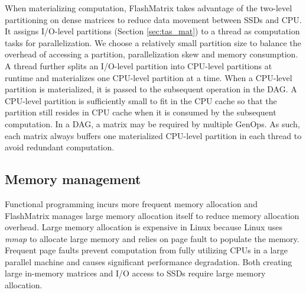 When materializing computation, FlashMatrix takes advantage of the two-level
partitioning on dense matrices to reduce data movement between SSDs and CPU.
It assigns I/O-level partitions (Section \ref{sec:tas_mat}) to a thread as
computation tasks for parallelization. We choose a relatively small partition
size to balance the overhead of accessing a partition, parallelization skew
and memory consumption. A thread further splits an I/O-level partition into
CPU-level partitions at runtime and materializes one CPU-level partition at
a time. When a CPU-level partition is materialized, it is passed to the
subsequent operation in the DAG. A CPU-level partition is sufficiently small
to fit in the CPU cache so that the partition still resides in CPU cache when
it is consumed by the subsequent computation. In a DAG, a matrix may be
required by multiple GenOps. As such, each matrix always buffers one materialized
CPU-level partition in each thread to avoid redundant computation.



\subsection{Memory management} \label{sec:mem}
Functional programming incurs more frequent memory allocation and FlashMatrix
manages large memory allocation itself to reduce memory allocation overhead.
Large memory allocation is expensive in Linux because Linux uses \textit{mmap}
to allocate large memory and relies on page fault to
populate the memory. Frequent page faults prevent computation from fully
utilizing CPUs in a large parallel machine and causes significant performance
degradation. Both creating large in-memory matrices and I/O access to SSDs
require large memory allocation.

